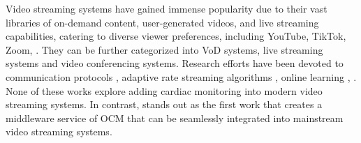  Video streaming systems have gained immense popularity due to their vast libraries of on-demand content, user-generated videos, and live streaming capabilities, catering to diverse viewer preferences, including YouTube, TikTok, Zoom, \etc. They can be further categorized into VoD systems, live streaming systems and video conferencing systems. Research efforts have been devoted to communication protocols \cite{hamadanian2023ekho, dhawaskar2023converge}, adaptive rate streaming algorithms  \cite{li2023dashlet, wen2023adaptivenet, zhou2019learning}, online learning \cite{tang2023lut, guan2023metastream, khani2023recl, yi2023boosting}, \etc. None of these works explore adding cardiac monitoring into modern video streaming systems. 
In contrast, \sysname stands out as the first work that creates a middleware service of OCM that can be seamlessly integrated into mainstream video streaming systems.